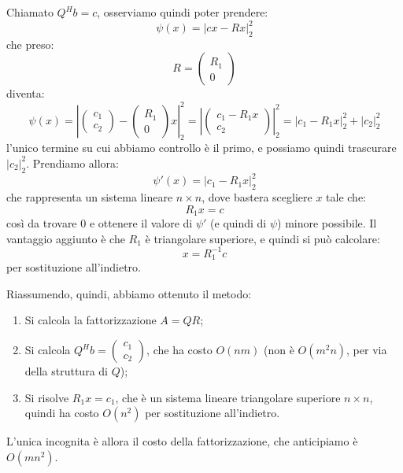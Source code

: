\documentclass[a4paper,11pt]{article}
\begin{document}
Chiamato $Q^H b = c$, osserviamo quindi poter prendere:
$$
\psi(x) = |cx - Rx|_2^2
$$
che preso:
	$$
R = \begin{pmatrix}
R_1 \\ 0
\end{pmatrix}
	$$
diventa:
$$
\psi(x) = \left| \begin{pmatrix}
	c_1 \\ c_2
\end{pmatrix} - \begin{pmatrix}
	R_1 \\ 0
\end{pmatrix} x \right|^2_2
=
\left|
\begin{pmatrix}
	c_1 - R_1 x \\ 
	c_2
\end{pmatrix}
\right|_2^2
=
\left|
	c_1 - R_1 x
\right|_2^2
+
|c_2|_2^2
$$
l'unico termine su cui abbiamo controllo è il primo, e possiamo quindi trascurare $|c_2|_2^2$.
Prendiamo allora:
$$
\psi'(x) = |c_1 - R_1 x|_2^2
$$
che rappresenta un sistema lineare $n \times n$, dove bastera scegliere $x$ tale che:
$$
R_1 x = c
$$
così da trovare 0 e ottenere il valore di $\psi'$ (e quindi di $\psi$) minore possibile.
Il vantaggio aggiunto è che $R_1$ è triangolare superiore, e quindi si può calcolare:
$$
x = R_1^{-1} c
$$
per sostituzione all'indietro.

Riassumendo, quindi, abbiamo ottenuto il metodo:
\begin{enumerate}
	\item Si calcola la fattorizzazione $A = QR$;
	\item Si calcola $Q^H b = \begin{pmatrix}
		c_1 \\ c_2
	\end{pmatrix}$, che ha costo $O(nm)$ (non è $O(m^2 n)$, per via della struttura di $Q$);
\item Si risolve $R_1 x = c_1$, che è un sistema lineare triangolare superiore $n \times n$, quindi ha costo $O(n^2)$ per sostituzione all'indietro.
\end{enumerate}

L'unica incognita è allora il costo della fattorizzazione, che anticipiamo è $O(mn^2)$.
\end{document}
